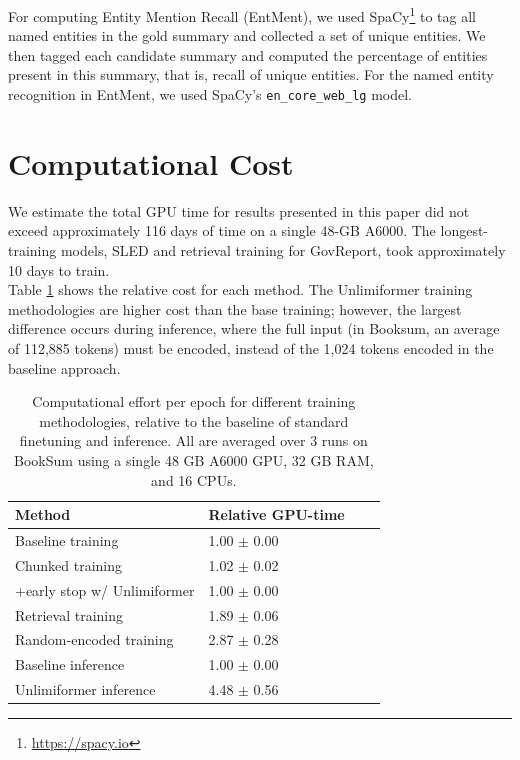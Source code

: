 \documentclass{article}
\newcommand{\ours}{Unlimiformer\xspace}
\begin{document}
For computing Entity Mention Recall (EntMent), we used SpaCy\footnote{\url{https://spacy.io}} to tag all named entities in the gold summary and collected a set of unique entities.
We then tagged each candidate summary and computed the percentage of entities present in this summary, that is, recall of unique entities.
For the named entity recognition in EntMent, we used SpaCy's \texttt{en\_core\_web\_lg} model.

\section{Computational Cost}
\label{appendix:subsect:computational-cost}
We estimate the total GPU time for results presented in this paper did not exceed approximately 116 days of time on a single 48-GB A6000. The longest-training models, SLED and retrieval training for GovReport, took approximately 10 days to train. \\

Table \ref{tab:computational-effort} shows the relative cost for each method. The \ours training methodologies are higher cost than the base training; however, the largest difference occurs during inference, where the full input (in Booksum, an average of 112,885 tokens) must be encoded, instead of the 1,024 tokens encoded in the baseline approach.


\begin{table}[h!]
\centering
\begin{tabular}{l|lll}
\toprule
Method                      & Relative GPU-time \\ 
\midrule
Baseline training                  &  1.00  $\pm$ 0.00                            \\
Chunked training            &        1.02   $\pm$ 0.02                       \\
+early stop w/ \ours &        1.00   $\pm$ 0.00                      \\
Retrieval training                &        1.89    $\pm$ 0.06                      \\
Random-encoded training           &        2.87    $\pm$ 0.28               \\ 
\midrule
Baseline inference & 1.00 $\pm$ 0.00 \\
\ours inference & 4.48 $\pm$ 0.56 \\
\bottomrule
\end{tabular} 
\caption{Computational effort per epoch for different training methodologies, relative to the baseline of standard finetuning and inference. All are averaged over 3 runs on BookSum using a single 48 GB A6000 GPU, 32 GB RAM, and 16 CPUs.}
\label{tab:computational-effort}
\end{table}
\end{document}
